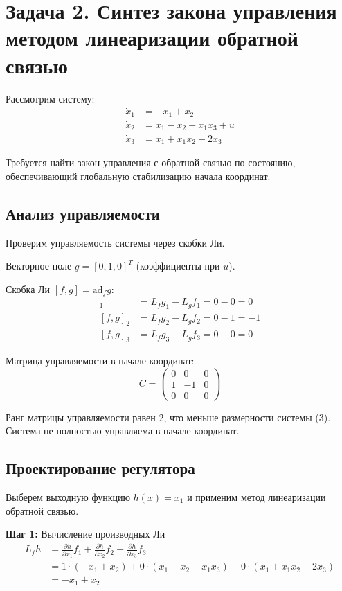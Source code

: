 \section{Задача 2. Синтез закона управления методом линеаризации обратной связью}

Рассмотрим систему:
\begin{align}
\dot{x}_1 &= -x_1 + x_2 \\
\dot{x}_2 &= x_1 - x_2 - x_1 x_3 + u \\
\dot{x}_3 &= x_1 + x_1 x_2 - 2x_3
\end{align}

Требуется найти закон управления с обратной связью по состоянию, обеспечивающий глобальную стабилизацию начала координат.

\subsection{Анализ управляемости}

Проверим управляемость системы через скобки Ли.

Векторное поле $g = [0, 1, 0]^T$ (коэффициенты при $u$).

Скобка Ли $[f, g] = \text{ad}_f g$:
\begin{align}
[f, g]_1 &= L_f g_1 - L_g f_1 = 0 - 0 = 0 \\
[f, g]_2 &= L_f g_2 - L_g f_2 = 0 - 1 = -1 \\
[f, g]_3 &= L_f g_3 - L_g f_3 = 0 - 0 = 0
\end{align}

Матрица управляемости в начале координат:
\begin{equation}
C = \begin{pmatrix} 0 & 0 & 0 \\ 1 & -1 & 0 \\ 0 & 0 & 0 \end{pmatrix}
\end{equation}

Ранг матрицы управляемости равен 2, что меньше размерности системы (3). Система не полностью управляема в начале координат.

\subsection{Проектирование регулятора}

Выберем выходную функцию $h(x) = x_1$ и применим метод линеаризации обратной связью.

\textbf{Шаг 1:} Вычисление производных Ли
\begin{align}
L_f h &= \frac{\partial h}{\partial x_1} f_1 + \frac{\partial h}{\partial x_2} f_2 + \frac{\partial h}{\partial x_3} f_3 \\
&= 1 \cdot (-x_1 + x_2) + 0 \cdot (x_1 - x_2 - x_1 x_3) + 0 \cdot (x_1 + x_1 x_2 - 2x_3) \\
&= -x_1 + x_2
\end{align}

